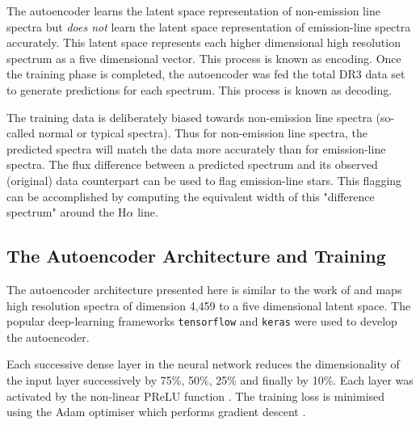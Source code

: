 The autoencoder learns the latent space representation of non-emission line spectra but \emph{does not} learn the latent space representation of emission-line spectra accurately. This latent space represents each higher dimensional high resolution spectrum as a five dimensional vector. This process is known as encoding. Once the training phase is completed, the autoencoder was fed the total DR3 data set to generate predictions for each spectrum. This process is known as decoding. 

The training data is deliberately biased towards non-emission line spectra (so-called normal or typical spectra). Thus for non-emission line spectra, the predicted spectra will match the data more accurately than for emission-line spectra. The flux difference between a predicted spectrum and its observed (original) data counterpart can be used to flag emission-line stars. This flagging can be accomplished by computing the equivalent width of this "difference spectrum" around the H$\alpha$ line.

\subsection{The Autoencoder Architecture and Training}

The autoencoder architecture presented here is similar to the work of \citet{vcotar2021galah} and maps high resolution spectra of dimension 4,459 to a five dimensional latent space. The popular deep-learning frameworks \texttt{tensorflow} \citep{tensorflow2015-whitepaper} and \texttt{keras} \citep{chollet2015keras} were used to develop the autoencoder.

Each successive dense layer in the neural network reduces the dimensionality of the input layer successively by 75\%, 50\%, 25\% and finally by 10\%. Each layer was activated by the non-linear PReLU function \citep{he2015delving}. The training loss is minimised using the Adam optimiser which performs gradient descent \citep{kingma2014adam}.

